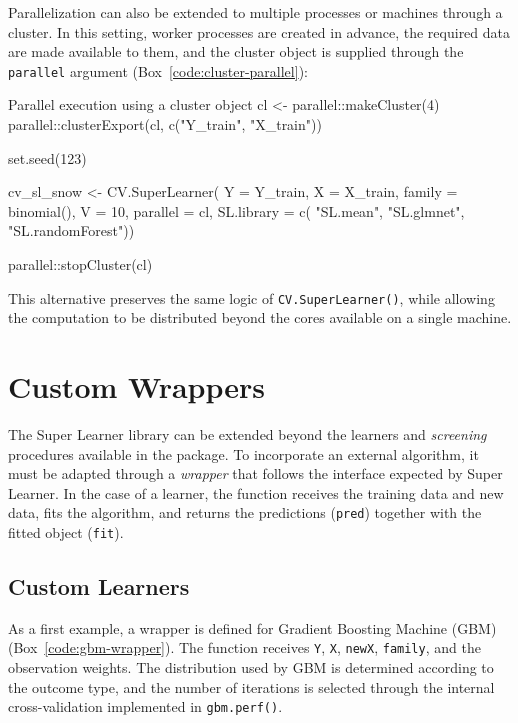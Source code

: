 \documentclass[12pt]{article}
\begin{document}
Parallelization can also be extended to multiple processes or machines through a cluster. In this setting, worker processes are created in advance, the required data are made available to them, and the cluster object is supplied through the \texttt{parallel} argument (Box~\ref{code:cluster-parallel}):

\begin{rcode}[label={code:cluster-parallel}]{Parallel execution using a cluster object}
	cl <- parallel::makeCluster(4)
	parallel::clusterExport(cl, c("Y_train", "X_train"))
	
	set.seed(123)
	
	cv_sl_snow <- CV.SuperLearner(
	Y = Y_train, X = X_train,
	family = binomial(),
	V = 10,
	parallel = cl,
	SL.library = c(
	"SL.mean",
	"SL.glmnet",
	"SL.randomForest"))
	
	parallel::stopCluster(cl)
\end{rcode}

This alternative preserves the same logic of \texttt{CV.SuperLearner()}, while allowing the computation to be distributed beyond the cores available on a single machine.


\section{Custom Wrappers}

The Super Learner library can be extended beyond the learners and \textit{screening} procedures available in the package. To incorporate an external algorithm, it must be adapted through a \textit{wrapper} that follows the interface expected by Super Learner. In the case of a learner, the function receives the training data and new data, fits the algorithm, and returns the predictions (\texttt{pred}) together with the fitted object (\texttt{fit}).

\subsection{Custom Learners}

As a first example, a wrapper is defined for Gradient Boosting Machine (GBM) (Box~\ref{code:gbm-wrapper}). The function receives \texttt{Y}, \texttt{X}, \texttt{newX}, \texttt{family}, and the observation weights. The distribution used by GBM is determined according to the outcome type, and the number of iterations is selected through the internal cross-validation implemented in \texttt{gbm.perf()}.
\end{document}
